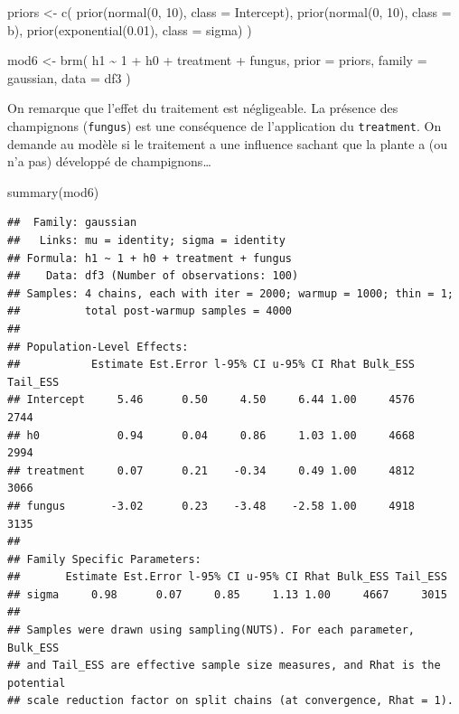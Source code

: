 \documentclass[
  a4paper,11pt,twoside,onecolumn,openright,final,oldfontcommands]{memoir}
\newenvironment{Shaded}{\begin{snugshade}}{\end{snugshade}}
\newcommand{\AttributeTok}[1]{\textcolor[rgb]{0.77,0.63,0.00}{#1}}
\newcommand{\DecValTok}[1]{\textcolor[rgb]{0.00,0.00,0.81}{#1}}
\newcommand{\FloatTok}[1]{\textcolor[rgb]{0.00,0.00,0.81}{#1}}
\newcommand{\FunctionTok}[1]{\textcolor[rgb]{0.00,0.00,0.00}{#1}}
\newcommand{\NormalTok}[1]{#1}
\newcommand{\OtherTok}[1]{\textcolor[rgb]{0.56,0.35,0.01}{#1}}
\newcommand{\SpecialCharTok}[1]{\textcolor[rgb]{0.00,0.00,0.00}{#1}}
\theoremstyle{definition}
\theoremstyle{definition}
\theoremstyle{definition}
\theoremstyle{remark}
\begin{document}
\begin{Shaded}
\begin{Highlighting}[]
\NormalTok{priors }\OtherTok{\textless{}{-}} \FunctionTok{c}\NormalTok{(}
  \FunctionTok{prior}\NormalTok{(}\FunctionTok{normal}\NormalTok{(}\DecValTok{0}\NormalTok{, }\DecValTok{10}\NormalTok{), }\AttributeTok{class =}\NormalTok{ Intercept),}
  \FunctionTok{prior}\NormalTok{(}\FunctionTok{normal}\NormalTok{(}\DecValTok{0}\NormalTok{, }\DecValTok{10}\NormalTok{), }\AttributeTok{class =}\NormalTok{ b),}
  \FunctionTok{prior}\NormalTok{(}\FunctionTok{exponential}\NormalTok{(}\FloatTok{0.01}\NormalTok{), }\AttributeTok{class =}\NormalTok{ sigma)}
\NormalTok{  )}

\NormalTok{mod6 }\OtherTok{\textless{}{-}} \FunctionTok{brm}\NormalTok{(}
\NormalTok{  h1 }\SpecialCharTok{\textasciitilde{}} \DecValTok{1} \SpecialCharTok{+}\NormalTok{ h0 }\SpecialCharTok{+}\NormalTok{ treatment }\SpecialCharTok{+}\NormalTok{ fungus,}
  \AttributeTok{prior =}\NormalTok{ priors,}
  \AttributeTok{family =}\NormalTok{ gaussian,}
  \AttributeTok{data =}\NormalTok{ df3}
\NormalTok{  )}
\end{Highlighting}
\end{Shaded}

On remarque que l'effet du traitement est négligeable. La présence des champignons (\texttt{fungus}) est une conséquence de l'application du \texttt{treatment}. On demande au modèle si le traitement a une influence sachant que la plante a (ou n'a pas) développé de champignons\ldots{}

\begin{Shaded}
\begin{Highlighting}[]
\FunctionTok{summary}\NormalTok{(mod6)}
\end{Highlighting}
\end{Shaded}

\begin{verbatim}
##  Family: gaussian 
##   Links: mu = identity; sigma = identity 
## Formula: h1 ~ 1 + h0 + treatment + fungus 
##    Data: df3 (Number of observations: 100) 
## Samples: 4 chains, each with iter = 2000; warmup = 1000; thin = 1;
##          total post-warmup samples = 4000
## 
## Population-Level Effects: 
##           Estimate Est.Error l-95% CI u-95% CI Rhat Bulk_ESS Tail_ESS
## Intercept     5.46      0.50     4.50     6.44 1.00     4576     2744
## h0            0.94      0.04     0.86     1.03 1.00     4668     2994
## treatment     0.07      0.21    -0.34     0.49 1.00     4812     3066
## fungus       -3.02      0.23    -3.48    -2.58 1.00     4918     3135
## 
## Family Specific Parameters: 
##       Estimate Est.Error l-95% CI u-95% CI Rhat Bulk_ESS Tail_ESS
## sigma     0.98      0.07     0.85     1.13 1.00     4667     3015
## 
## Samples were drawn using sampling(NUTS). For each parameter, Bulk_ESS
## and Tail_ESS are effective sample size measures, and Rhat is the potential
## scale reduction factor on split chains (at convergence, Rhat = 1).
\end{verbatim}
\end{document}
